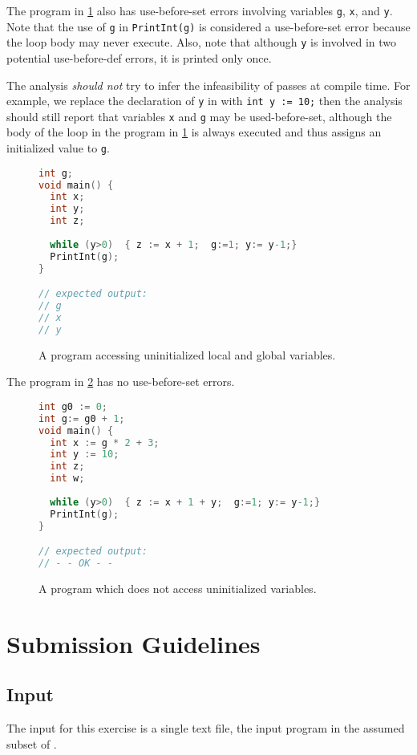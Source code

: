 \documentclass{article}
\begin{document}
The program in \cref{fig:example-loop} also has use-before-set errors involving variables
\texttt{g}, \texttt{x}, and \texttt{y}.
Note that the use of \texttt{g} in \texttt{PrintInt(g)} is considered a use-before-set error because the loop body may never execute.
Also, note that although \texttt{y} is involved in two potential use-before-def errors, it is printed only once.

The analysis \emph{should not} try to infer the infeasibility of passes at compile time. For example, we replace the declaration of \texttt{y} in  with 
\texttt{int y := 10;}
then the analysis should still report that variables \texttt{x} and \texttt{g} may be used-before-set, although the body of the loop in the program in \cref{fig:example-loop} is always executed and thus assigns an initialized value to \texttt{g}.


\begin{figure}
\centering
\begin{lstlisting}[language=C]
int g;
void main() {
  int x;
  int y;
  int z;
  
  while (y>0)  { z := x + 1;  g:=1; y:= y-1;}
  PrintInt(g);
}

// expected output:
// g
// x
// y
\end{lstlisting}
\caption{A program accessing uninitialized local and global variables.}
\label{fig:example-loop}
\end{figure} 

The program in \cref{fig:example-ok}  has no use-before-set errors. 


\begin{figure}
\centering
\begin{lstlisting}[language=C]
int g0 := 0;
int g:= g0 + 1;
void main() {
  int x := g * 2 + 3;
  int y := 10;
  int z;
  int w;
  
  while (y>0)  { z := x + 1 + y;  g:=1; y:= y-1;}
  PrintInt(g);
}

// expected output:
// - - OK - -
\end{lstlisting}
\caption{A program which does not access uninitialized variables.}
\label{fig:example-ok}
\end{figure} 

\section{Submission Guidelines}
 
\subsection{Input}
The input for this exercise is a single text file, the input program in the assumed subset of  \plname.
\end{document}
